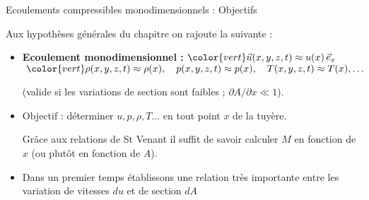 \begin{frame}{Ecoulements compressibles monodimensionnels : Objectifs}
	
	\medskip

Aux hypothèses générales du chapitre on rajoute la suivante : 

\begin{itemize}
	\item[\checkmark] {\bf Ecoulement monodimensionnel : }
	$\color{vert} \myvec{u}(x, y, z, t) \approx u(x)\, \myvec{e}_x$ \quad$\; \color{vert} \rho(x, y, z, t) \approx \rho(x),
\quad p(x, y, z, t) \approx p(x), \quad T(x, y, z, t) \approx T(x), \ldots$
	
	(valide si les variations de section sont faibles ; $\partial A/ \partial x \ll 1$).
	
	


\item Objectif : déterminer $u,p,\rho,T...$ en tout point $x$ de la tuyère.

Grâce aux relations de St Venant il suffit de savoir calculer $M$ en fonction de $x$ (ou plutôt en fonction de $A$).


\item Dans un premier temps établissons une relation très importante entre les variation de vitesses $du$ et de section $dA$


\end{itemize}



\vspace{5mm}

\end{frame}



